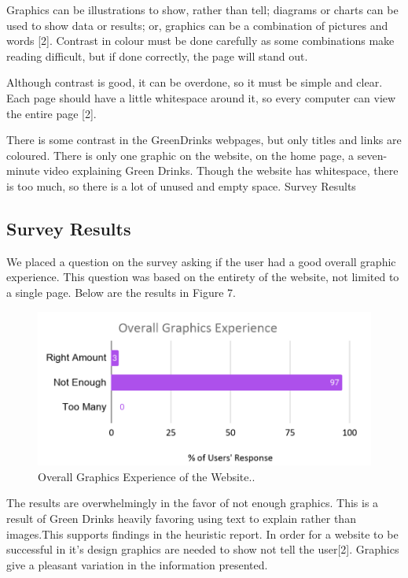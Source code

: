 \documentclass[12pt]{article}
\begin{document}
Graphics can be illustrations to show, rather than tell; diagrams or charts can be used to show data or results; or, graphics can be a combination of pictures and words [2]. Contrast in colour must be done carefully as some combinations make reading difficult, but if done correctly, the page will stand out. 

Although contrast is good, it can be overdone, so it must be simple and clear. Each page should have a little whitespace around it, so every computer can view the entire page [2].

There is some contrast in the GreenDrinks webpages, but only titles and links are coloured. There is only one graphic on the website, on the home page, a seven-minute video explaining Green Drinks. Though the website has whitespace, there is too much, so there is a lot of unused and empty space.
Survey Results
\subsection{Survey Results}
We placed a question on the survey asking if the user had a good overall graphic experience. This question was based on the entirety of the website, not limited to a single page. Below are the results in Figure 7.

\begin{figure}[ht]
\centering
\includegraphics[width=1.0\textwidth]{f7}
\caption[Overall Graphics Experience of the Website.]{Overall Graphics Experience of the Website.\footnotemark.}
\end{figure}

The results are overwhelmingly in the favor of not enough graphics. This is a result of Green Drinks heavily favoring using text to explain rather than images.This supports findings in the heuristic report. In order for a website to be successful in it’s design graphics are needed to show not tell the user[2]. Graphics give a pleasant variation in the information presented.
\end{document}
